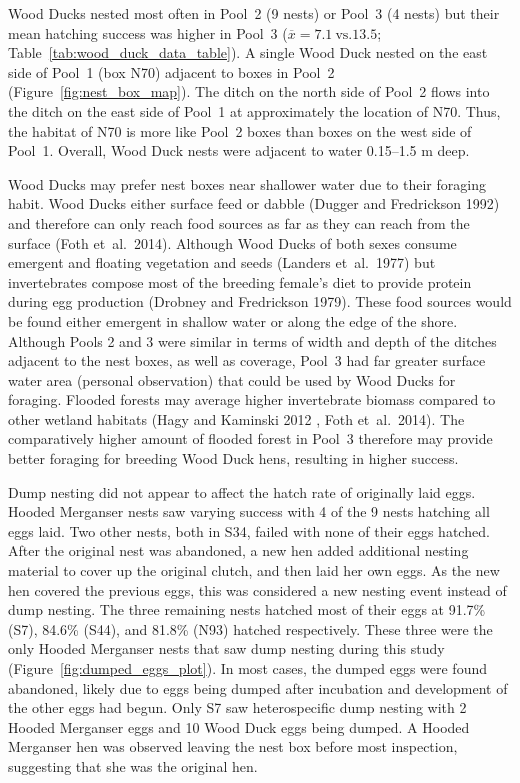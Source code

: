 Wood Ducks nested most often in Pool~2 (9 nests) or Pool~3 (4 nests) but their mean hatching success was higher in Pool~3 ($\overline{x} = 7.1~\mathrm{vs.} 13.5$; Table~\ref{tab:wood_duck_data_table}).  A single Wood Duck nested on the east side of Pool~1 (box N70) adjacent to boxes in Pool~2 (Figure~\ref{fig:nest_box_map}). The ditch on the north side of Pool~2 flows into the ditch on the east side of Pool~1 at approximately the location of N70. Thus, the habitat of N70 is more like Pool~2 boxes than boxes on the west side of Pool~1. Overall, Wood Duck nests were adjacent to water 0.15–1.5 m deep.   



Wood Ducks may prefer nest boxes near shallower water due to their foraging habit. Wood Ducks either surface feed or dabble (Dugger and Fredrickson 1992) and therefore can only reach food sources as far as they can reach from the surface (Foth et~al.~2014). Although Wood Ducks of both sexes consume emergent and floating vegetation and seeds (Landers et~al.~1977) but invertebrates compose most of the breeding female’s diet to provide protein during egg production (Drobney and Fredrickson 1979). These food sources would be found either emergent in shallow water or along the edge of the shore. Although Pools 2 and 3 were similar in terms of width and depth of the ditches adjacent to the nest boxes, as well as coverage, Pool~3 had far greater surface water area (personal observation) that could be used by Wood Ducks for foraging. Flooded forests may average higher invertebrate biomass compared to other wetland habitats (Hagy and Kaminski 2012 , Foth et~al.~2014). The comparatively higher amount of flooded forest in Pool~3 therefore may provide better foraging for breeding Wood Duck hens, resulting in higher success.  

Dump nesting did not appear to affect the hatch rate of originally laid eggs. Hooded Merganser nests saw varying success with 4 of the 9 nests hatching all eggs laid. Two other nests, both in S34, failed with none of their eggs hatched. After the original nest was abandoned, a new hen added additional nesting material to cover up the original clutch, and then laid her own eggs. As the new hen covered the previous eggs, this was considered a new nesting event instead of dump nesting. The three remaining nests hatched most of their eggs at 91.7\% (S7), 84.6\% (S44), and 81.8\% (N93) hatched respectively. These three were the only Hooded Merganser nests that saw dump nesting during this study (Figure~\ref{fig:dumped_eggs_plot}). In most cases, the dumped eggs were found abandoned, likely due to eggs being dumped after incubation and development of the other eggs had begun. Only S7 saw heterospecific dump nesting with 2 Hooded Merganser eggs and 10 Wood Duck eggs being dumped. A Hooded Merganser hen was observed leaving the nest box before most inspection, suggesting that she was the original hen.  


